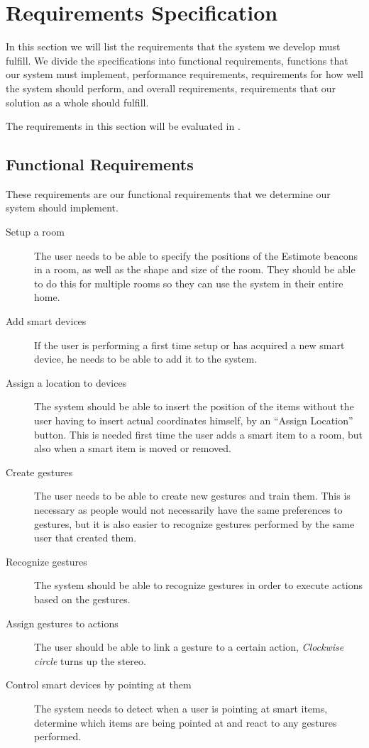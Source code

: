 \section{Requirements Specification}
\label{sec:requirements-specification}

In this section we will list the requirements that the system we develop must fulfill.
We divide the specifications into functional requirements, 
\ie functions that our system must implement,
performance requirements,
\ie requirements for how well the system should perform,
and overall requirements, 
\ie requirements that our solution as a whole should fulfill.

The requirements in this section will be evaluated in .

\subsection{Functional Requirements}
These requirements are our functional requirements that we determine our system should implement.  
\begin{description}
    \item[Setup a room] The user needs to be able to specify the positions of the Estimote beacons in a room, as well as the shape and size of the room. They should be able to do this for multiple rooms so they can use the system in their entire home.
    \item[Add smart devices] If the user is performing a first time setup or has acquired a new smart device, he needs to be able to add it to the system. 
    \item[Assign a location to devices] The system should be able to insert the position of the items without the user having to insert actual coordinates himself, \eg by an ``Assign Location'' button. This is needed first time the user adds a smart item to a room, but also when a smart item is moved or removed.
    \item[Create gestures] The user needs to be able to create new gestures and train them. This is necessary as people would not necessarily have the same preferences to gestures, but it is also easier to recognize gestures performed by the same user that created them.
    \item[Recognize gestures] The system should be able to recognize gestures in order to execute actions based on the gestures.
    \item[Assign gestures to actions] The user should be able to link a gesture to a certain action, \eg \textit{Clockwise circle} turns up the stereo.
    \item[Control smart devices by pointing at them] The system needs to detect when a user is pointing at smart items, determine which items are being pointed at and react to any gestures performed.
\end{description}

